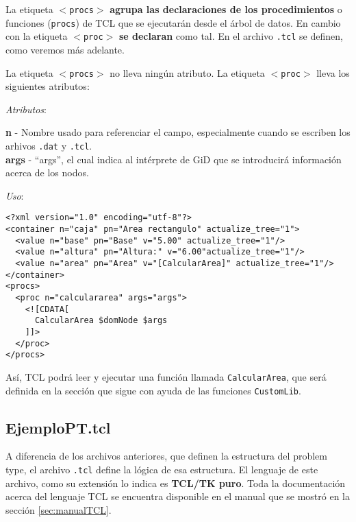 \documentclass[10pt, a4paper, twocolumn]{article} %
\begin{document}
La etiqueta \texttt{$<$procs$>$} \textbf{agrupa las declaraciones de los procedimientos} o funciones (\texttt{procs}) de TCL que se ejecutarán desde el árbol de datos. En cambio con la etiqueta \texttt{$<$proc$>$} \textbf{se declaran} como tal. En el archivo \texttt{.tcl} se definen, como veremos más adelante.

La etiqueta \texttt{$<$procs$>$} no lleva ningún atributo. La etiqueta \texttt{$<$proc$>$} lleva los siguientes atributos:

\vspace{0.15cm}
\textit{Atributos}:

\vspace{0.15cm}
	\textbf{n} - Nombre usado para referenciar el campo, especialmente cuando se escriben los arhivos \texttt{.dat} y \texttt{.tcl}.\\
	\textbf{args} - ``args'', el cual indica al intérprete de GiD que se introducirá información acerca de los nodos.\\
\vspace{0.15cm}

\textit{Uso}:
\vspace{0.15cm}

\lstset{language=XML} 
\begin{lstlisting}
<?xml version="1.0" encoding="utf-8"?>
<container n="caja" pn="Area rectangulo" actualize_tree="1">
  <value n="base" pn="Base" v="5.00" actualize_tree="1"/>
  <value n="altura" pn="Altura:" v="6.00"actualize_tree="1"/>
  <value n="area" pn="Area" v="[CalcularArea]" actualize_tree="1"/>
</container>
<procs>
  <proc n="calculararea" args="args">
    <![CDATA[
      CalcularArea $domNode $args
    ]]>
  </proc>
</procs>
\end{lstlisting}

Así, TCL podrá leer y ejecutar una función llamada \texttt{CalcularArea}, que será definida en la sección que sigue con ayuda de las funciones \texttt{CustomLib}.


\subsection{EjemploPT.tcl}

A diferencia de los archivos anteriores, que definen la estructura del problem type, el archivo \texttt{.tcl} define la lógica de esa estructura. El lenguaje de este archivo, como su extensión lo indica es \textbf{TCL/TK puro}. Toda la documentación acerca del lenguaje TCL se encuentra disponible en el manual que se mostró en la sección \ref{sec:manualTCL}.
\end{document}
